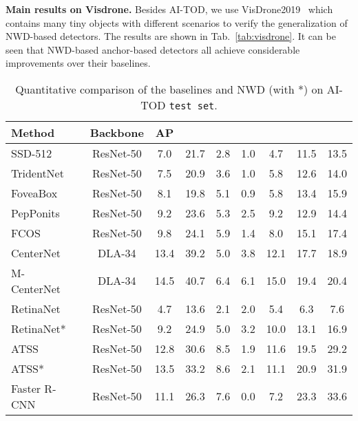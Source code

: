 \documentclass{article}
\begin{document}
\textbf{Main results on Visdrone.} Besides AI-TOD, we use VisDrone2019~\cite{visdrone2019_2019_iccvw} which contains many tiny objects with different scenarios to verify the generalization of NWD-based detectors. The results are shown in Tab.~\ref{tab:visdrone}. It can be seen that NWD-based anchor-based detectors all achieve considerable improvements over their baselines. 


\begin{table*}[t]
    \setlength{\belowcaptionskip}{0.1cm}
    \renewcommand{\arraystretch}{0.92}
    \caption{Quantitative comparison of the baselines and NWD (with *) on  AI-TOD {\tt test set}.}
	\centering
\begin{tabular}{|l|c|ccccccc|}  
	\hline
	 Method                                     & Backbone & AP &  &  &  &  &  & \\
	\hline
SSD-512~\cite{SSD_2016_ECCV}        	    & ResNet-50 	& 7.0	& 21.7  & 2.8  & 1.0 & 4.7 & 11.5 & 13.5  \\
	 TridentNet~\cite{Trident-Net_2019_ICCV}      & ResNet-50 	    & 7.5	& 20.9  & 3.6  & 1.0 & 5.8 & 12.6 & 14.0   \\
	 FoveaBox~\cite{FoveaBox_2020_TIP}          & ResNet-50 	& 8.1	& 19.8  & 5.1  & 0.9 & 5.8 & 13.4  & 15.9  \\
	 PepPonits~\cite{RepPoints_2019_ICCV}       & ResNet-50 	& 9.2	& 23.6  & 5.3  & 2.5 & 9.2 & 12.9  & 14.4  \\
	 FCOS~\cite{FCOS_2019_ICCV}                 & ResNet-50 	& 9.8	& 24.1  & 5.9  & 1.4 & 8.0 & 15.1  & 17.4  \\
CenterNet~\cite{CenterNet_2019_arXiv}      & DLA-34            & 13.4  & 39.2  & 5.0  & 3.8 & 12.1 & 17.7 & 18.9  \\
	 M-CenterNet~\cite{AI-TOD_2020_ICPR}        & DLA-34            & 14.5  & 40.7  & 6.4  & 6.1 & 15.0 & 19.4 & 20.4  \\
\hline
	 RetinaNet~\cite{Focal-Loss_2017_ICCV}      & ResNet-50 	& 4.7	& 13.6  & 2.1  & 2.0 & 5.4 & 6.3  & 7.6   \\
	 RetinaNet*                                 & ResNet-50 	& 9.2	& 24.9  & 5.0  & 3.2 & 10.0 & 13.1  & 16.9   \\
	 \hline
	 ATSS~\cite{atss_2020_cvpr}                 & ResNet-50 	& 12.8	& 30.6  & 8.5  & 1.9 & 11.6 & 19.5 & 29.2   \\
	 ATSS*                                      & ResNet-50 	& 13.5	& 33.2  & 8.6  & 2.1 & 11.1 & 20.9 & 31.9   \\
	 \hline
	 Faster R-CNN~\cite{Faster-R-CNN_2015_NIPS} & ResNet-50 	& 11.1	& 26.3  & 7.6  & 0.0 & 7.2 & 23.3 & 33.6   \\

\end{tabular}
\end{table*}
\end{document}
